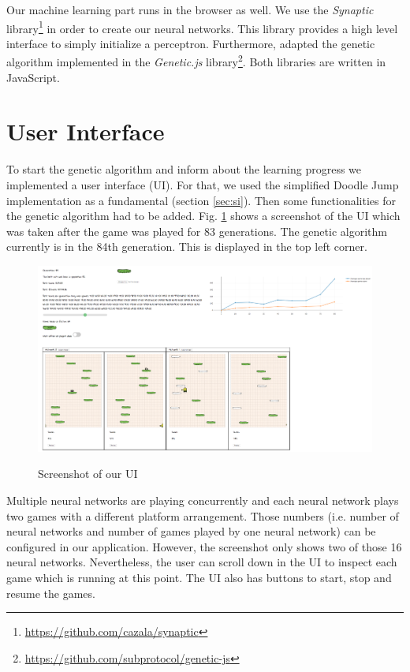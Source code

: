 \documentclass[a4paper,12pt,pagesize,headsepline,bibtotoc,titlepage,abstracton]{scrartcl}
\begin{document}
Our machine learning part runs in the browser as well. We use the \textit{Synaptic} library\footnote{\url{https://github.com/cazala/synaptic}} in order to create our neural networks. This library provides a high level interface to simply initialize a perceptron. Furthermore, adapted the genetic algorithm implemented in the \textit{Genetic.js} library\footnote{\url{https://github.com/subprotocol/genetic-js}}. Both libraries are written in JavaScript.


\section{User Interface}

To start the genetic algorithm and inform about the learning progress we implemented a user interface (UI). For that, we used the simplified Doodle Jump implementation as a fundamental (section \ref{sec:si}). Then some functionalities for the genetic algorithm had to be added. Fig. \ref{abb:ui} shows a screenshot of the UI which was taken after the game was played for 83 generations. The genetic algorithm currently is in the 84th generation. This is displayed in the top left corner.

\begin{figure}[h]
\begin{center}
\includegraphics*[width=1\textwidth]{images/ui}\\
\caption{Screenshot of our UI}
\label{abb:ui}
\end{center}
\end{figure}

Multiple neural networks are playing concurrently and each neural network plays two games with a different platform arrangement. Those numbers (i.e. number of neural networks and number of games played by one neural network) can be configured in our application. However, the screenshot only shows two of those 16 neural networks. Nevertheless, the user can scroll down in the UI to inspect each game which is running at this point. The UI also has buttons to start, stop and resume the games.
\end{document}

